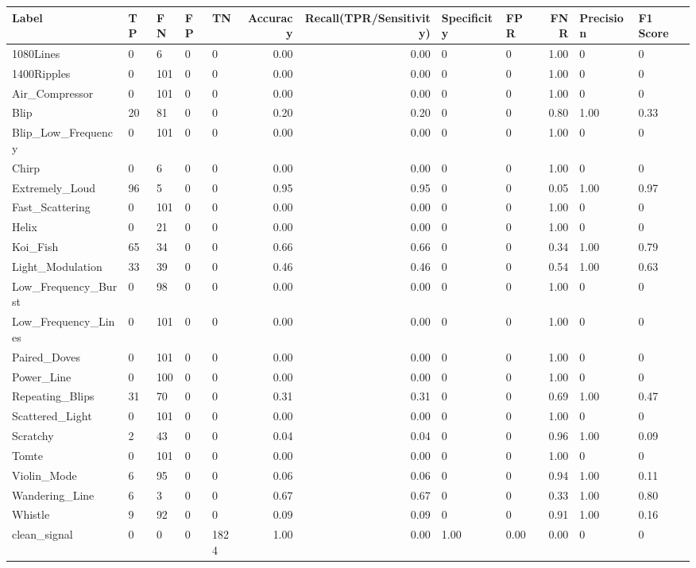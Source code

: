 \begin{tabular}{lllllrrllrll}
\toprule
Label & TP & FN & FP & TN & Accuracy & Recall(TPR/Sensitivity) & Specificity & FPR & FNR & Precision & F1 Score \\
\midrule
1080Lines & 0 & 6 & 0 & 0 & 0.00 & 0.00 & 0 & 0 & 1.00 & 0 & 0 \\
1400Ripples & 0 & 101 & 0 & 0 & 0.00 & 0.00 & 0 & 0 & 1.00 & 0 & 0 \\
Air_Compressor & 0 & 101 & 0 & 0 & 0.00 & 0.00 & 0 & 0 & 1.00 & 0 & 0 \\
Blip & 20 & 81 & 0 & 0 & 0.20 & 0.20 & 0 & 0 & 0.80 & 1.00 & 0.33 \\
Blip_Low_Frequency & 0 & 101 & 0 & 0 & 0.00 & 0.00 & 0 & 0 & 1.00 & 0 & 0 \\
Chirp & 0 & 6 & 0 & 0 & 0.00 & 0.00 & 0 & 0 & 1.00 & 0 & 0 \\
Extremely_Loud & 96 & 5 & 0 & 0 & 0.95 & 0.95 & 0 & 0 & 0.05 & 1.00 & 0.97 \\
Fast_Scattering & 0 & 101 & 0 & 0 & 0.00 & 0.00 & 0 & 0 & 1.00 & 0 & 0 \\
Helix & 0 & 21 & 0 & 0 & 0.00 & 0.00 & 0 & 0 & 1.00 & 0 & 0 \\
Koi_Fish & 65 & 34 & 0 & 0 & 0.66 & 0.66 & 0 & 0 & 0.34 & 1.00 & 0.79 \\
Light_Modulation & 33 & 39 & 0 & 0 & 0.46 & 0.46 & 0 & 0 & 0.54 & 1.00 & 0.63 \\
Low_Frequency_Burst & 0 & 98 & 0 & 0 & 0.00 & 0.00 & 0 & 0 & 1.00 & 0 & 0 \\
Low_Frequency_Lines & 0 & 101 & 0 & 0 & 0.00 & 0.00 & 0 & 0 & 1.00 & 0 & 0 \\
Paired_Doves & 0 & 101 & 0 & 0 & 0.00 & 0.00 & 0 & 0 & 1.00 & 0 & 0 \\
Power_Line & 0 & 100 & 0 & 0 & 0.00 & 0.00 & 0 & 0 & 1.00 & 0 & 0 \\
Repeating_Blips & 31 & 70 & 0 & 0 & 0.31 & 0.31 & 0 & 0 & 0.69 & 1.00 & 0.47 \\
Scattered_Light & 0 & 101 & 0 & 0 & 0.00 & 0.00 & 0 & 0 & 1.00 & 0 & 0 \\
Scratchy & 2 & 43 & 0 & 0 & 0.04 & 0.04 & 0 & 0 & 0.96 & 1.00 & 0.09 \\
Tomte & 0 & 101 & 0 & 0 & 0.00 & 0.00 & 0 & 0 & 1.00 & 0 & 0 \\
Violin_Mode & 6 & 95 & 0 & 0 & 0.06 & 0.06 & 0 & 0 & 0.94 & 1.00 & 0.11 \\
Wandering_Line & 6 & 3 & 0 & 0 & 0.67 & 0.67 & 0 & 0 & 0.33 & 1.00 & 0.80 \\
Whistle & 9 & 92 & 0 & 0 & 0.09 & 0.09 & 0 & 0 & 0.91 & 1.00 & 0.16 \\
clean_signal & 0 & 0 & 0 & 1824 & 1.00 & 0.00 & 1.00 & 0.00 & 0.00 & 0 & 0 \\
\bottomrule
\end{tabular}

